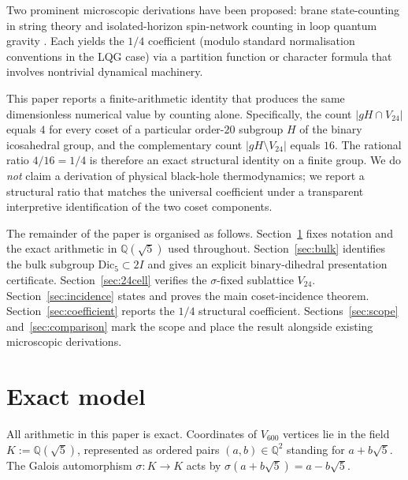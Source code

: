\documentclass[11pt]{article}
\newcommand{\twoI}{2I}
\newcommand{\Vsixhundred}{V_{600}}
\newcommand{\Dicfive}{\mathrm{Dic}_5}
\newcommand{\Vtwentyfour}{V_{24}}
\newcommand{\sigmaG}{\sigma}
\begin{document}
Two prominent microscopic derivations have been proposed: brane
state-counting in string theory \citep{StromingerVafa1996} and
isolated-horizon spin-network counting in loop quantum gravity
\citep{AshtekarBaezKrasnov2000}. Each yields the $1/4$ coefficient
(modulo standard normalisation conventions in the LQG case) via a
partition function or character formula that involves nontrivial
dynamical machinery.

This paper reports a finite-arithmetic identity that produces the same
dimensionless numerical value by counting alone. Specifically, the count
$|gH \cap \Vtwentyfour|$ equals $4$ for every coset of a particular
order-$20$ subgroup $H$ of the binary icosahedral group, and the
complementary count $|gH \setminus \Vtwentyfour|$ equals $16$. The
rational ratio $4/16 = 1/4$ is therefore an exact structural identity
on a finite group. We do \emph{not} claim a derivation of physical
black-hole thermodynamics; we report a structural ratio that matches
the universal coefficient under a transparent interpretive
identification of the two coset components.

The remainder of the paper is organised as follows.
Section~\ref{sec:model} fixes notation and the exact arithmetic in
$\mathbb{Q}(\sqrt{5})$ used throughout.
Section~\ref{sec:bulk} identifies the bulk subgroup $\Dicfive \subset \twoI$
and gives an explicit binary-dihedral presentation certificate.
Section~\ref{sec:24cell} verifies the $\sigmaG$-fixed sublattice
$\Vtwentyfour$.
Section~\ref{sec:incidence} states and proves the main coset-incidence
theorem. Section~\ref{sec:coefficient} reports the $1/4$ structural
coefficient. Sections~\ref{sec:scope} and~\ref{sec:comparison} mark the
scope and place the result alongside existing microscopic derivations.

\section{Exact model}\label{sec:model}

All arithmetic in this paper is exact. Coordinates of $\Vsixhundred$
vertices lie in the field $K := \mathbb{Q}(\sqrt{5})$, represented as
ordered pairs $(a,b) \in \mathbb{Q}^2$ standing for $a + b\sqrt{5}$.
The Galois automorphism $\sigmaG : K \to K$ acts by
$\sigmaG(a + b\sqrt{5}) = a - b\sqrt{5}$.
\end{document}

